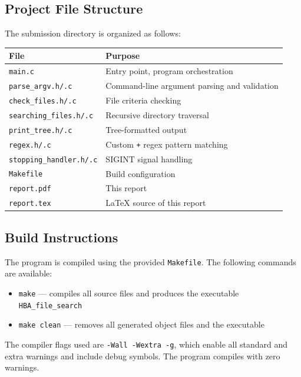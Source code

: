 \documentclass[12pt, a4paper]{article}
\begin{document}
\subsection{Project File Structure}

The submission directory is organized as follows:

\begin{center}
\begin{tabular}{ll}
\toprule
\textbf{File} & \textbf{Purpose} \\
\midrule
\texttt{main.c}                & Entry point, program orchestration \\
\texttt{parse\_argv.h/.c}      & Command-line argument parsing and validation \\
\texttt{check\_files.h/.c}     & File criteria checking \\
\texttt{searching\_files.h/.c} & Recursive directory traversal \\
\texttt{print\_tree.h/.c}      & Tree-formatted output \\
\texttt{regex.h/.c}            & Custom \texttt{+} regex pattern matching \\
\texttt{stopping\_handler.h/.c}& SIGINT signal handling \\
\texttt{Makefile}              & Build configuration \\
\texttt{report.pdf}            & This report \\
\texttt{report.tex}            & LaTeX source of this report \\
\bottomrule
\end{tabular}
\end{center}

\subsection{Build Instructions}

The program is compiled using the provided \texttt{Makefile}. The following commands
are available:

\begin{itemize}[noitemsep]
    \item \texttt{make} — compiles all source files and produces the executable \texttt{HBA\_file\_search}
    \item \texttt{make clean} — removes all generated object files and the executable
\end{itemize}

The compiler flags used are \texttt{-Wall -Wextra -g}, which enable all standard and
extra warnings and include debug symbols. The program compiles with zero warnings.
\end{document}
